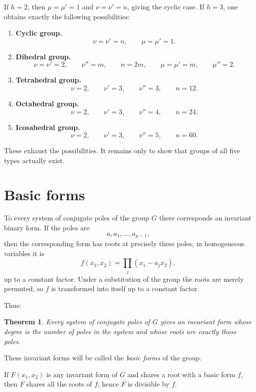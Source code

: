 \documentclass[11pt]{article}
\newtheorem*{theorem*}{Theorem}
\begin{document}
If $h=2$, then $\mu=\mu'=1$ and $\nu=\nu'=n$, giving the cyclic case.  If $h=3$, one obtains exactly the following possibilities:

\begin{enumerate}[label=\Roman*.]
\item \textbf{Cyclic group.}
\[
 \nu=\nu'=n,
 \qquad \mu=\mu'=1.
\]
\item \textbf{Dihedral group.}
\[
 \nu=\nu'=2,
 \qquad \nu''=m,
 \qquad n=2m,
 \qquad \mu=\mu'=m,
 \qquad \mu''=2.
\]
\item \textbf{Tetrahedral group.}
\[
 \nu=2,
 \qquad \nu'=3,
 \qquad \nu''=3,
 \qquad n=12.
\]
\item \textbf{Octahedral group.}
\[
 \nu=2,
 \qquad \nu'=3,
 \qquad \nu''=4,
 \qquad n=24.
\]
\item \textbf{Icosahedral group.}
\[
 \nu=2,
 \qquad \nu'=3,
 \qquad \nu''=5,
 \qquad n=60.
\]
\end{enumerate}

These exhaust the possibilities.  It remains only to show that groups of all five types actually exist.

\section{Basic forms}

To every system of conjugate poles of the group $G$ there corresponds an invariant binary form.  If the poles are
\[
 a,a_1,\ldots,a_{\mu-1},
\]
then the corresponding form has roots at precisely these poles; in homogeneous variables it is
\begin{equation}\label{eq:w9-basic-form}
 f(x_1,x_2)=\prod_j(x_1-a_jx_2),
\end{equation}
up to a constant factor.  Under a substitution of the group the roots are merely permuted, so $f$ is transformed into itself up to a constant factor.

Thus:

\begin{theorem*}
Every system of conjugate poles of $G$ gives an invariant form whose degree is the number of poles in the system and whose roots are exactly those poles.
\end{theorem*}

These invariant forms will be called the \emph{basic forms} of the group.

If $F(x_1,x_2)$ is any invariant form of $G$ and shares a root with a basic form $f$, then $F$ shares all the roots of $f$; hence $F$ is divisible by $f$.
\end{document}
